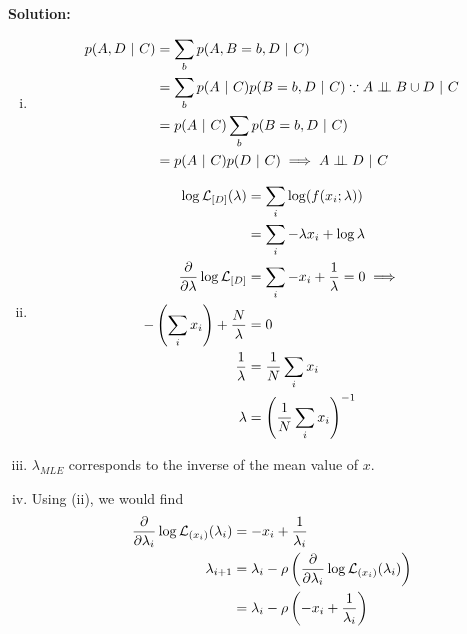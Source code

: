 \textbf{Solution:}

\begin{enumerate}[(i)]
    \item 
    \begin{align*}
        p(A, D ~\vert~ C) &= \sum_b p(A, B=b, D ~\vert~ C)\\
        &= \sum_b p(A ~\vert~ C) p(B = b, D ~\vert~ C) \because A \perp\!\!\!\perp B \cup D ~\vert~ C\\
        &= p(A ~\vert~ C) \sum_b p(B = b, D ~\vert~ C)\\
        &= p(A ~\vert~ C) p(D ~\vert~ C) \implies A \perp\!\!\!\perp D ~\vert~ C
    \end{align*}
    
    \item
    \begin{align*}
        \log\likelihood_{[D]}(\lambda) &= \sum_i \log(f(x_i ; \lambda))\\
            &= \sum_i -\lambda x_i + \log \lambda\\
        \pdv{}{\lambda}\log\likelihood_{[D]} &= \sum_i -x_i + \frac{1}{\lambda} = 0 \implies \\
        -\left(\sum_i x_i\right) + \frac{N}{\lambda} &= 0\\
        \frac{1}{\lambda} &= \frac{1}{N} \sum_i x_i \\
        \lambda &= \left(\frac{1}{N} \sum_i x_i\right)^{-1}
    \end{align*}
    
    \item $\lambda_{MLE}$ corresponds to the inverse of the mean value of $x$. 
    
    \item Using (ii), we would find
    \begin{align*}
        \pdv{}{\lambda_i} \log \likelihood_{(x_i)}(\lambda_i) &= -x_i + \frac{1}{\lambda_i}\\
        \lambda_{i+1} &= \lambda_i - \rho \left(\pdv{}{\lambda_i} \log \likelihood_{(x_i)}(\lambda_i)\right)\\
            &= \lambda_i - \rho\left(-x_i + \frac{1}{\lambda_i}\right)
    \end{align*}
    
    
\end{enumerate}